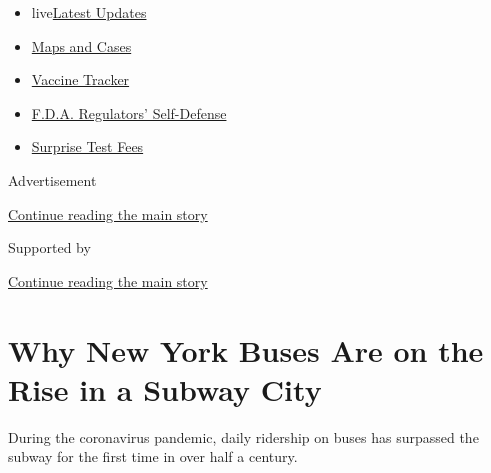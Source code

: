 \begin{itemize}
\tightlist
\item
  live\href{https://www.nytimes3xbfgragh.onion/2020/09/11/world/covid-19-coronavirus.html?name=styln-coronavirus-national\&region=TOP_BANNER\&block=storyline_menu_recirc\&action=click\&pgtype=Article\&impression_id=4db95070-f4c0-11ea-8629-2f0d22bd94c8\&variant=undefined}{Latest
  Updates}
\item
  \href{https://www.nytimes3xbfgragh.onion/interactive/2020/us/coronavirus-us-cases.html?name=styln-coronavirus-national\&region=TOP_BANNER\&block=storyline_menu_recirc\&action=click\&pgtype=Article\&impression_id=4db95071-f4c0-11ea-8629-2f0d22bd94c8\&variant=undefined}{Maps
  and Cases}
\item
  \href{https://www.nytimes3xbfgragh.onion/interactive/2020/science/coronavirus-vaccine-tracker.html?name=styln-coronavirus-national\&region=TOP_BANNER\&block=storyline_menu_recirc\&action=click\&pgtype=Article\&impression_id=4db95072-f4c0-11ea-8629-2f0d22bd94c8\&variant=undefined}{Vaccine
  Tracker}
\item
  \href{https://www.nytimes3xbfgragh.onion/2020/09/10/us/politics/fda-coronavirus-vaccine.html?name=styln-coronavirus-national\&region=TOP_BANNER\&block=storyline_menu_recirc\&action=click\&pgtype=Article\&impression_id=4db95073-f4c0-11ea-8629-2f0d22bd94c8\&variant=undefined}{F.D.A.
  Regulators' Self-Defense}
\item
  \href{https://www.nytimes3xbfgragh.onion/2020/09/09/upshot/coronavirus-surprise-test-fees.html?name=styln-coronavirus-national\&region=TOP_BANNER\&block=storyline_menu_recirc\&action=click\&pgtype=Article\&impression_id=4dc00730-f4c0-11ea-8629-2f0d22bd94c8\&variant=undefined}{Surprise
  Test Fees}
\end{itemize}

Advertisement

\protect\hyperlink{after-top}{Continue reading the main story}

Supported by

\protect\hyperlink{after-sponsor}{Continue reading the main story}

\hypertarget{why-new-york-buses-are-on-the-rise-in-a-subway-city}{%
\section{Why New York Buses Are on the Rise in a Subway
City}\label{why-new-york-buses-are-on-the-rise-in-a-subway-city}}

During the coronavirus pandemic, daily ridership on buses has surpassed
the subway for the first time in over half a century.

